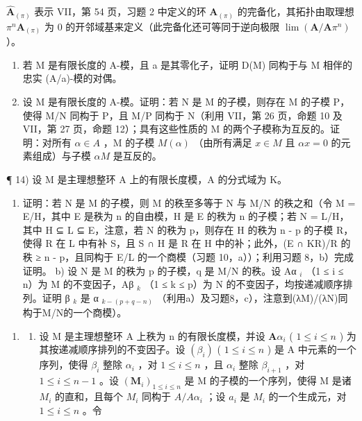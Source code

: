 \(\hat{\mathbf{A}}_{(\pi)}\) 表示 VII，第 54 页，习题 2 中定义的环 \(\mathbf{A}_{(\pi)}\) 的完备化，其拓扑由取理想 \(\pi^n\mathbf{A}_{(\pi)}\) 为 0 的开邻域基来定义（此完备化还可等同于逆向极限 \(\lim (\mathbf{A} / \mathbf{A}\pi^n)\) ）。

\begin{enumerate}
\def\labelenumi{\alph{enumi})}
\setcounter{enumi}{5}
\item
  若 M 是有限长度的 A-模，且 a 是其零化子，证明 D(M) 同构于与 M 相伴的忠实 (A/a)-模的对偶。
\item
  设 M 是有限长度的 A-模。证明：若 N 是 M 的子模，则存在 M 的子模 P，使得 M/N 同构于 P，且 M/P 同构于 N（利用 VII，第 26 页，命题 10 及 VII，第 27 页，命题 12）；具有这些性质的 M 的两个子模称为互反的。证明：对所有 \(\alpha \in A\) ，M 的子模 \(M(\alpha)\) （由所有满足 \(x \in M\) 且 \(\alpha x = 0\) 的元素组成）与子模 \(\alpha M\) 是互反的。
\end{enumerate}

¶ 14) 设 M 是主理想整环 A 上的有限长度模，A 的分式域为 K。

\begin{enumerate}
\def\labelenumi{\alph{enumi})}
\tightlist
\item
  证明：若 N 是 M 的子模，则 M 的秩至多等于 N 与 M/N 的秩之和（令 M = E/H，其中 E 是秩为 n 的自由模，H 是 E 的秩为 n 的子模；若 N = L/H，其中 H ⊆ L ⊆ E，注意，若 N 的秩为 p，则存在 H 的秩为 n - p 的子模 R，使得 R 在 L 中有补 S，且 S ∩ H 是 R 在 H 中的补；此外，(E ∩ KR)/R 的秩 ≥ n - p，且同构于 E/L 的一个商模（习题 10，a））；利用习题 8，b）完成证明。 b) 设 N 是 M 的秩为 p 的子模，q 是 M/N 的秩。设 Aα \(_{i}\) （1 ≤ i ≤ n）为 M 的不变因子，Aβ \(_{k}\) （1 ≤ k ≤ p）为 N 的不变因子，均按递减顺序排列。证明 β \(_{k}\) 是 α \(_{k- (p + q - n)}\) （利用a）及习题8，c），注意到(λM)/(λN)同构于M/N的一个商模）。
\end{enumerate}

\begin{enumerate}
\def\labelenumi{\arabic{enumi})}
\setcounter{enumi}{14}
\tightlist
\item
  \begin{enumerate}
  \def\labelenumii{\alph{enumii})}
  \tightlist
  \item
    设 M 是主理想整环 A 上秩为 n 的有限长度模，并设 \(\mathbf{A}\alpha_{i}\) ( \(1 \leqslant i \leqslant n\) ) 为其按递减顺序排列的不变因子。设 \((\beta_{i})\) ( \(1 \leqslant i \leqslant n\) ) 是 A 中元素的一个序列，使得 \(\beta_{i}\) 整除 \(\alpha_{i}\) ，对 \(1 \leqslant i \leqslant n\) ，且 \(\alpha_{i}\) 整除 \(\beta_{i+1}\) ，对 \(1 \leqslant i \leqslant n-1\) 。设 \((\mathbf{M}_{i})_{1 \leqslant i \leqslant n}\) 是 M 的子模的一个序列，使得 M 是诸 \(M_{i}\) 的直和，且每个 \(M_{i}\) 同构于 \(A/A\alpha_{i}\) ；设 \(a_{i}\) 是 \(M_{i}\) 的一个生成元，对 \(1 \leqslant i \leqslant n\) 。令
  \end{enumerate}
\end{enumerate}

